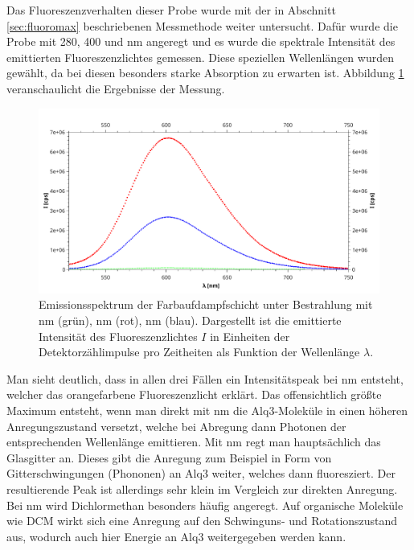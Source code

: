 		Das Fluoreszenzverhalten dieser Probe wurde mit der in Abschnitt \ref{sec:fluoromax} beschriebenen Messmethode weiter untersucht. Dafür wurde die Probe mit 280, 400 und \unit[500]{nm} angeregt und es wurde die spektrale Intensität des emittierten Fluoreszenzlichtes gemessen. Diese speziellen Wellenlängen wurden gewählt, da bei diesen besonders starke Absorption zu erwarten ist. Abbildung \ref{fig:flouromax_emission} veranschaulicht die Ergebnisse der Messung.
		\begin{figure}[htb]
			\centering
			\includegraphics[width=0.75\linewidth]{pic/flouromax_emission.pdf}
			\caption{Emissionsspektrum der Farbaufdampfschicht unter Bestrahlung mit \unit[280]{nm} (grün), \unit[400]{nm} (rot), \unit[500]{nm} (blau). Dargestellt ist die emittierte Intensität des Fluoreszenzlichtes $I$ in Einheiten der Detektorzählimpulse pro Zeitheiten als Funktion der Wellenlänge $\lambda$.}
			\label{fig:flouromax_emission}
		\end{figure}
		Man sieht deutlich, dass in allen drei Fällen ein Intensitätspeak bei \unit[600]{nm} entsteht, welcher das orangefarbene Fluoreszenzlicht erklärt. Das offensichtlich größte Maximum entsteht, wenn man direkt mit \unit[400]{nm} die Alq3-Moleküle in einen höheren Anregungszustand versetzt, welche bei Abregung dann Photonen der entsprechenden Wellenlänge emittieren. Mit \unit[280]{nm} regt man hauptsächlich das Glasgitter an. Dieses gibt die Anregung zum Beispiel in Form von Gitterschwingungen (Phononen) an Alq3 weiter, welches dann fluoresziert. Der resultierende Peak ist allerdings sehr klein im Vergleich zur direkten Anregung. Bei \unit[500]{nm} wird Dichlormethan besonders häufig angeregt. Auf organische Moleküle wie DCM wirkt sich eine Anregung auf den Schwinguns- und Rotationszustand aus, wodurch auch hier Energie an Alq3 weitergegeben werden kann. 